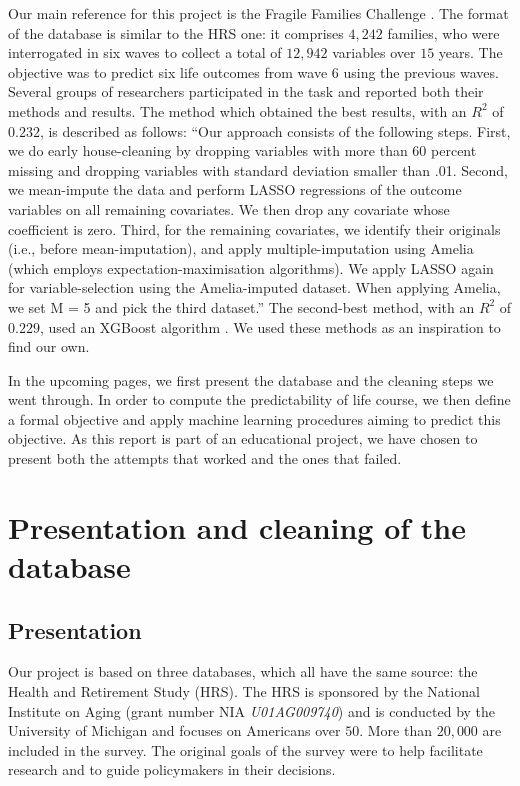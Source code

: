 \documentclass[]{article}
\begin{document}
\noindent
Our main reference for this project is the Fragile Families Challenge \cite{challenge2017}. The format of the database is similar to the HRS one: it comprises $4,242$ families, who were interrogated in six waves to collect a total of $12,942$ variables over $15$ years. The objective was to predict six life outcomes from wave 6 using the previous waves. Several groups of researchers participated in the task and reported both their methods and results. The method which obtained the best results, with an $R^2$ of $0.232$, is described as follows: “Our approach consists of the following steps. First, we do early house-cleaning by dropping variables with more than 60 percent missing and dropping variables with standard deviation smaller than .01. Second, we mean-impute the data and perform LASSO regressions of the outcome variables on all remaining covariates. We then drop any covariate whose coefficient is zero. Third, for the remaining covariates, we identify their originals (i.e., before mean-imputation), and apply multiple-imputation using Amelia \cite{amelia2011} (which employs expectation-maximisation algorithms). We apply LASSO again for variable-selection using the Amelia-imputed dataset. When applying Amelia, we set M = 5 and pick the third dataset.” 
The second-best method, with an $R^2$ of $0.229$, used an XGBoost algorithm \cite{xgboost2016}. We used these methods as an inspiration to find our own.

\noindent
In the upcoming pages, we first present the database and the cleaning steps we went through. In order to compute the predictability of life course, we then define a formal objective and apply machine learning procedures aiming to predict this objective. As this report is part of an educational project, we have chosen to present both the attempts that worked and the ones that failed.

\section{Presentation and cleaning of the database}
\subsection{Presentation}
Our project is based on three databases, which all have the same source: the Health and Retirement Study (HRS). The HRS is sponsored by the National Institute on Aging (grant number NIA \textit{U01AG009740}) and is conducted by the University of Michigan and focuses on Americans over $50$. More than $20,000$ are included in the survey. The original goals of the survey were to help facilitate research and to guide policymakers in their decisions.\\
\end{document}
